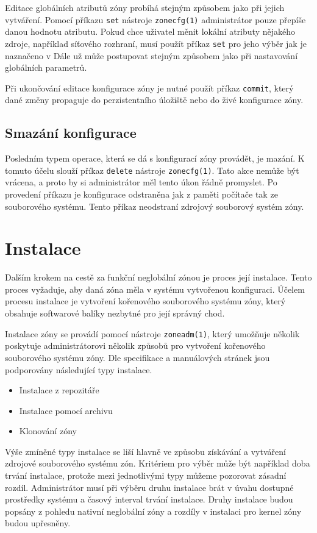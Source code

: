 Editace globálních atributů zóny probíhá stejným způsobem jako při jejich vytváření. Pomocí příkazu \verb|set| nástroje
\verb|zonecfg(1)| administrátor pouze přepíše danou hodnotu atributu. Pokud chce uživatel měnit lokální atributy nějakého zdroje,
například síťového rozhraní, musí použít příkaz \verb|set| pro jeho výběr jak je naznačeno v \cite{oracle:solaris:zones:modify}
Dále už může postupovat stejným způsobem jako při nastavování globálních parametrů.

Při ukončování editace konfigurace zóny je nutné použít příkaz \verb|commit|, který dané změny propaguje do perzistentního 
úložiště nebo do živé konfigurace zóny.
\subsection{Smazání konfigurace}
\label{chapter:zones:configuration:deleting}
Posledním typem operace, která se dá s konfigurací zóny provádět, je mazání. K tomuto účelu slouží příkaz \verb|delete| nástroje
\verb|zonecfg(1)|. Tato akce nemůže být vrácena, a proto by si administrátor měl tento úkon řádně promyslet. Po provedení
příkazu je konfigurace odstraněna jak z paměti počítače tak ze souborového systému. Tento příkaz neodstraní zdrojový souborový
systém zóny.
\section{Instalace}
\label{chapter:zones:instalation}
Dalším krokem na cestě za funkční neglobální zónou je proces její instalace. Tento proces vyžaduje, aby daná zóna měla v
systému vytvořenou konfiguraci. Účelem procesu instalace je vytvoření kořenového souborového systému zóny, který obsahuje
softwarové balíky nezbytné pro její správný chod.

Instalace zóny se provádí pomocí nástroje \verb|zoneadm(1)|, který umožňuje několik poskytuje administrátorovi několik způsobů
pro vytvoření kořenového souborového systému zóny. Dle specifikace \cite{oracle:solaris:zones:installation} a manuálových stránek
\cite{oracle:manpages:zoneadm} jsou podporovány následující typy instalace.
\begin{itemize}
 \item Instalace z repozitáře
 \item Instalace pomocí archivu
 \item Klonování zóny
\end{itemize}
Výše zmíněné typy instalace se liší hlavně ve způsobu získávání a vytváření zdrojové souborového systému zón. Kritériem pro
výběr může být například doba trvání instalace, protože mezi jednotlivými typy můžeme pozorovat zásadní rozdíl. Administrátor
musí při výběru druhu instalace brát v úvahu dostupné prostředky systému a časový interval trvání instalace. Druhy instalace
budou popsány z pohledu nativní neglobální zóny a rozdíly v instalaci pro kernel zóny budou upřesněny. 
